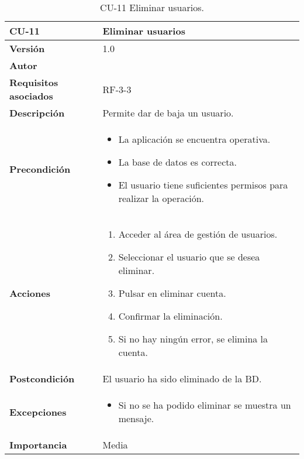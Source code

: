 \begin{table}[p]
	\centering
	\begin{tabularx}{\linewidth}{ p{} p{} }
		\toprule
		\textbf{CU-11}    & \textbf{ Eliminar usuarios}\\
		\toprule
		\textbf{Versión}              & 1.0    \\
		\textbf{Autor}                & \@author{} \\
		\textbf{Requisitos asociados} & RF-3-3\\
		\textbf{Descripción}          & Permite dar de baja un usuario. \\
		\textbf{Precondición}         &
		\begin{itemize}
			\tightlist
			\item La aplicación se encuentra operativa.
			\item La base de datos es correcta.
			\item El usuario tiene suficientes permisos para realizar la operación.
		\end{itemize}\\
		\textbf{Acciones}             &
		\begin{enumerate}
			\tightlist
			\item Acceder al área de gestión de usuarios.
			\item Seleccionar el usuario que se desea eliminar.
			\item Pulsar en eliminar cuenta.
			\item Confirmar la eliminación.
			\item Si no hay ningún error, se elimina la cuenta.
		\end{enumerate}\\
		\textbf{Postcondición}        & El usuario ha sido eliminado de la BD.\\
		\textbf{Excepciones}          &
		\begin{itemize}
			\tightlist
			\item Si no se ha podido eliminar se muestra un mensaje.
		\end{itemize}\\
		\textbf{Importancia}          & Media\\
		\bottomrule
	\end{tabularx}
	\caption{CU-11 Eliminar usuarios.}\label{tab:table-11}
\end{table}

